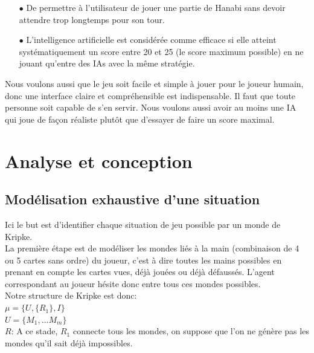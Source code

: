 \documentclass[11pt, letterpaper]{article}
\begin{document}
\begin{itemize}
    \item[$\bullet$] De permettre à l'utilisateur de jouer une partie de Hanabi sans devoir attendre trop longtemps pour son tour.

    \item[$\bullet$] L'intelligence artificielle est considérée comme efficace si elle atteint systématiquement un score entre 20 et 25 (le score maximum possible) en ne jouant qu'entre des IAs avec la même stratégie.\\
\end{itemize}

\noindent
Nous voulons aussi que le jeu soit facile et simple à jouer pour le joueur humain, donc une interface claire et compréhensible est indispensable. Il faut que toute personne soit capable de s'en servir. Nous voulons aussi avoir au moins une IA qui joue de façon réaliste plutôt que d'essayer de faire un score maximal.\\


\section{Analyse et conception}

\subsection{Modélisation exhaustive d'une situation}

\noindent
Ici le but est d'identifier chaque situation de jeu possible par un monde de Kripke.\\

\noindent
La première étape est de modéliser les mondes liés à la main (combinaison de 4 ou 5 cartes sans ordre) du joueur, c'est à dire toutes les mains possibles en prenant en compte les cartes vues, déjà jouées ou déjà défaussés. L'agent correspondant au joueur hésite donc entre tous ces mondes possibles.\\

\noindent
Notre structure de Kripke est donc:\\

$\mu=\{U,\{R_{1}\},I \}  $\\
$   U=\{M_{1},...M_{m} \}   $\\

\noindent
$R$: A ce stade, $R_{1}$ connecte tous les mondes, on suppose que l'on ne génère pas les mondes qu'il sait déjà impossibles.\\
\end{document}
